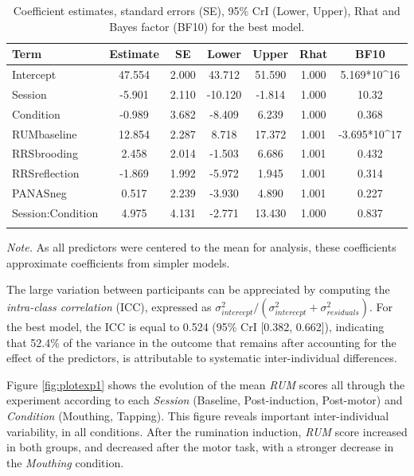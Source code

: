 \documentclass[a4paper,12pt,twoside,openright,oldfontcommands,final]{memoir}
\begin{document}
\begin{table}[H]
\begin{center}
\begin{threeparttable}
\caption{\label{tab:paramexp2}Coefficient estimates, standard errors (SE), 95\% CrI (Lower, Upper), Rhat and Bayes factor (BF10) for the best model.}
\small{
\begin{tabular}{lcccccc}
\toprule
Term & \multicolumn{1}{c}{Estimate} & \multicolumn{1}{c}{SE} & \multicolumn{1}{c}{Lower} & \multicolumn{1}{c}{Upper} & \multicolumn{1}{c}{Rhat} & \multicolumn{1}{c}{BF10}\\
\midrule
Intercept & 47.554 & 2.000 & 43.712 & 51.590 & 1.000 & 5.169*10\textasciicircum{}16\\
Session & -5.901 & 2.110 & -10.120 & -1.814 & 1.000 & 10.32\\
Condition & -0.989 & 3.682 & -8.409 & 6.239 & 1.000 & 0.368\\
RUMbaseline & 12.854 & 2.287 & 8.718 & 17.372 & 1.001 & -3.695*10\textasciicircum{}17\\
RRSbrooding & 2.458 & 2.014 & -1.503 & 6.686 & 1.001 & 0.432\\
RRSreflection & -1.869 & 1.992 & -5.972 & 1.945 & 1.001 & 0.314\\
PANASneg & 0.517 & 2.239 & -3.930 & 4.890 & 1.001 & 0.227\\
Session:Condition & 4.975 & 4.131 & -2.771 & 13.430 & 1.000 & 0.837\\
\bottomrule
\addlinespace
\end{tabular}
}
\begin{tablenotes}[para]
\textit{Note.} As all predictors were centered to the mean for analysis, these coefficients approximate coefficients from simpler models.
\end{tablenotes}
\end{threeparttable}
\end{center}
\end{table}

The large variation between participants can be appreciated by computing the \emph{intra-class correlation} (ICC), expressed as \(\sigma_{intercept}^{2}/(\sigma_{intercept}^{2}+\sigma_{residuals}^{2})\). For the best model, the ICC is equal to 0.524 (95\% CrI {[}0.382, 0.662{]}), indicating that 52.4\% of the variance in the outcome that remains after accounting for the effect of the predictors, is attributable to systematic inter-individual differences.

Figure \ref{fig:plotexp1} shows the evolution of the mean \emph{RUM} scores all through the experiment according to each \emph{Session} (Baseline, Post-induction, Post-motor) and \emph{Condition} (Mouthing, Tapping). This figure reveals important inter-individual variability, in all conditions. After the rumination induction, \emph{RUM} score increased in both groups, and decreased after the motor task, with a stronger decrease in the \emph{Mouthing} condition.
\end{document}

